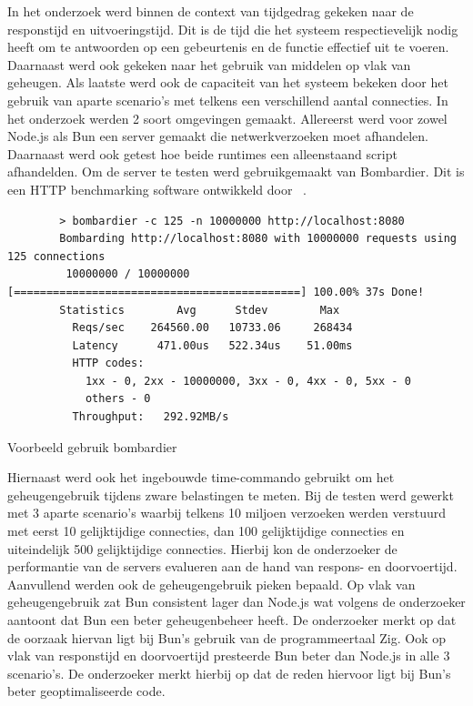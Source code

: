 In het onderzoek werd binnen de context van tijdgedrag gekeken naar de responstijd en uitvoeringstijd. 
Dit is de tijd die het systeem respectievelijk nodig heeft om te antwoorden op een gebeurtenis en de functie effectief uit te voeren.
Daarnaast werd ook gekeken naar het gebruik van middelen op vlak van geheugen.
Als laatste werd ook de capaciteit van het systeem bekeken door het gebruik van aparte scenario's met telkens een verschillend aantal connecties.
In het onderzoek werden 2 soort omgevingen gemaakt. Allereerst werd voor zowel Node.js als Bun een server gemaakt die netwerkverzoeken moet afhandelen.
Daarnaast werd ook getest hoe beide runtimes een alleenstaand script afhandelden.
Om de server te testen werd gebruikgemaakt van Bombardier. Dit is een HTTP benchmarking software ontwikkeld door ~\textcite{Fedoseev2023}.
\begin{listing}[H]
    \centering
    \begin{verbatim}
        > bombardier -c 125 -n 10000000 http://localhost:8080
        Bombarding http://localhost:8080 with 10000000 requests using 125 connections
         10000000 / 10000000 [============================================] 100.00% 37s Done!
        Statistics        Avg      Stdev        Max
          Reqs/sec    264560.00   10733.06     268434
          Latency      471.00us   522.34us    51.00ms
          HTTP codes:
            1xx - 0, 2xx - 10000000, 3xx - 0, 4xx - 0, 5xx - 0
            others - 0
          Throughput:   292.92MB/s
        \end{verbatim}
        \caption{Voorbeeld gebruik bombardier \autocite{Fedoseev2023}}
\end{listing}
Hiernaast werd ook het ingebouwde time-commando gebruikt om het geheugengebruik tijdens zware belastingen te meten.
Bij de testen werd gewerkt met 3 aparte scenario's waarbij telkens 10 miljoen verzoeken werden verstuurd met eerst 10 gelijktijdige connecties, 
dan 100 gelijktijdige connecties en uiteindelijk 500 gelijktijdige connecties.
Hierbij kon de onderzoeker de performantie van de servers evalueren aan de hand van respons- en doorvoertijd. Aanvullend werden ook de geheugengebruik pieken bepaald.
Op vlak van geheugengebruik zat Bun consistent lager dan Node.js wat volgens de onderzoeker aantoont dat Bun een beter geheugenbeheer heeft. 
De onderzoeker merkt op dat de oorzaak hiervan ligt bij Bun's gebruik van de programmeertaal Zig. 
Ook op vlak van responstijd en doorvoertijd presteerde Bun beter dan Node.js in alle 3 scenario's.
De onderzoeker merkt hierbij op dat de reden hiervoor ligt bij Bun's beter geoptimaliseerde code.


